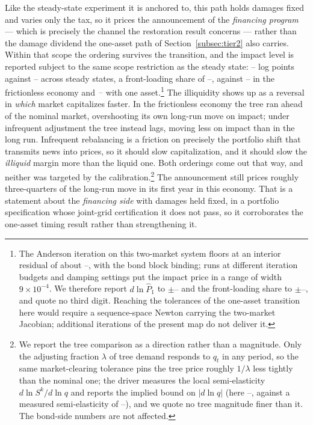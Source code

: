 \documentclass[12pt]{article}
\providecommand{\pendingnum}{\textit{--}}
\providecommand{\KVTrResid}{\pendingnum}\providecommand{\KVTrTerm}{\pendingnum}
\providecommand{\KVTrImpP}{\pendingnum}\providecommand{\KVTrLongP}{\pendingnum}
\providecommand{\KVTrShare}{\pendingnum}\providecommand{\KVTrQBound}{\pendingnum}
\providecommand{\KVTrElas}{\pendingnum}
\providecommand{\KVTrImpBand}{\pendingnum}\providecommand{\KVTrShareBand}{\pendingnum}
\providecommand{\TwoTrShare}{\pendingnum}\providecommand{\TwoTrImpQ}{\pendingnum}
\newcommand{\Sfun}{S}
\begin{document}
Like the steady-state experiment it is anchored to, this path holds damages
fixed and varies only the tax, so it prices the announcement of the
\emph{financing program} --- which is precisely the channel the restoration
result concerns --- rather than the damage dividend the one-asset path of
Section~\ref{subsec:tier2} also carries. Within that scope the ordering
survives the transition, and the impact level is reported subject to the
same scope restriction as the steady state: $\KVTrImpP$ log points against $\KVTrLongP$ across steady states, a
front-loading share of $\KVTrShare$, against $\TwoTrShare$ in the
frictionless economy and $\OneTrShare$ with one asset.\footnote{The
Anderson iteration on this two-market system floors at an interior residual
of about $\KVTrResid$, with the bond block binding; runs at different
iteration budgets and damping settings put the impact price in a range of
width $9\times10^{-4}$. We therefore report $d\ln\hat P_1$ to
$\pm\KVTrImpBand$ and the front-loading share to $\pm\KVTrShareBand$, and
quote no third digit. Reaching the tolerances of the one-asset transition
here would require a sequence-space Newton carrying the two-market
Jacobian; additional iterations of the present map do not deliver it.} The illiquidity
shows up as a reversal in \emph{which} market capitalizes faster. In the
frictionless economy the tree ran ahead of the nominal market, overshooting
its own long-run move on impact; under infrequent adjustment the tree
instead lags, moving less on impact than in the long run. Infrequent
rebalancing is a friction on precisely the portfolio shift that transmits
news into prices, so it should slow capitalization, and it should slow the
\emph{illiquid} margin more than the liquid one. Both orderings come out
that way, and neither was targeted by the calibration.\footnote{We report
the tree comparison as a direction rather than a magnitude. Only the
adjusting fraction $\lambda$ of tree demand responds to $q_t$ in any
period, so the same market-clearing tolerance pins the tree price roughly
$1/\lambda$ less tightly than the nominal one; the driver measures the
local semi-elasticity $d\ln \Sfun^{k}/d\ln q$ and reports the implied bound
on $|d\ln q|$ (here $\KVTrQBound$, against a measured semi-elasticity of
$\KVTrElas$), and we quote no tree magnitude finer than it. The bond-side
numbers are not affected.} The announcement still prices roughly
three-quarters of the long-run move in its first year in this economy. That
is a statement about the \emph{financing side} with damages held fixed, in a
portfolio specification whose joint-grid certification it does not pass, so
it corroborates the one-asset timing result rather than strengthening it.
\end{document}
